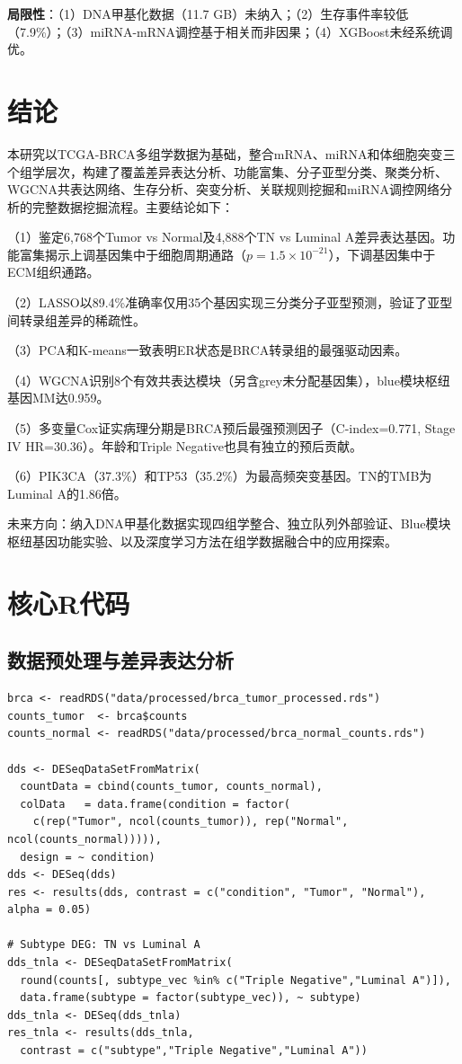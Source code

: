 \documentclass[12pt,a4paper,openany]{ctexbook}
\begin{document}
\textbf{局限性}：（1）DNA甲基化数据（11.7 GB）未纳入；（2）生存事件率较低（7.9\%）；（3）miRNA-mRNA调控基于相关而非因果；（4）XGBoost未经系统调优。

\chapter{结论}
本研究以TCGA-BRCA多组学数据为基础，整合mRNA、miRNA和体细胞突变三个组学层次，构建了覆盖差异表达分析、功能富集、分子亚型分类、聚类分析、WGCNA共表达网络、生存分析、突变分析、关联规则挖掘和miRNA调控网络分析的完整数据挖掘流程。主要结论如下：

（1）鉴定6,768个Tumor vs Normal及4,888个TN vs Luminal A差异表达基因。功能富集揭示上调基因集中于细胞周期通路（$p=1.5\times10^{-21}$），下调基因集中于ECM组织通路。

（2）LASSO以89.4\%准确率仅用35个基因实现三分类分子亚型预测，验证了亚型间转录组差异的稀疏性。

（3）PCA和K-means一致表明ER状态是BRCA转录组的最强驱动因素。

（4）WGCNA识别8个有效共表达模块（另含grey未分配基因集），blue模块枢纽基因MM达0.959。

（5）多变量Cox证实病理分期是BRCA预后最强预测因子（C-index=0.771, Stage IV HR=30.36）。年龄和Triple Negative也具有独立的预后贡献。

（6）PIK3CA（37.3\%）和TP53（35.2\%）为最高频突变基因。TN的TMB为Luminal A的1.86倍。

未来方向：纳入DNA甲基化数据实现四组学整合、独立队列外部验证、Blue模块枢纽基因功能实验、以及深度学习方法在组学数据融合中的应用探索。

\printbibliography

\newpage
\appendix
\chapter{核心R代码}

\section{数据预处理与差异表达分析}
\begin{lstlisting}[caption={mRNA预处理与DESeq2差异表达}, basicstyle=\ttfamily\scriptsize]
brca <- readRDS("data/processed/brca_tumor_processed.rds")
counts_tumor  <- brca$counts
counts_normal <- readRDS("data/processed/brca_normal_counts.rds")

dds <- DESeqDataSetFromMatrix(
  countData = cbind(counts_tumor, counts_normal),
  colData   = data.frame(condition = factor(
    c(rep("Tumor", ncol(counts_tumor)), rep("Normal", ncol(counts_normal))))),
  design = ~ condition)
dds <- DESeq(dds)
res <- results(dds, contrast = c("condition", "Tumor", "Normal"), alpha = 0.05)

# Subtype DEG: TN vs Luminal A
dds_tnla <- DESeqDataSetFromMatrix(
  round(counts[, subtype_vec %in% c("Triple Negative","Luminal A")]),
  data.frame(subtype = factor(subtype_vec)), ~ subtype)
dds_tnla <- DESeq(dds_tnla)
res_tnla <- results(dds_tnla,
  contrast = c("subtype","Triple Negative","Luminal A"))
\end{lstlisting}
\end{document}
